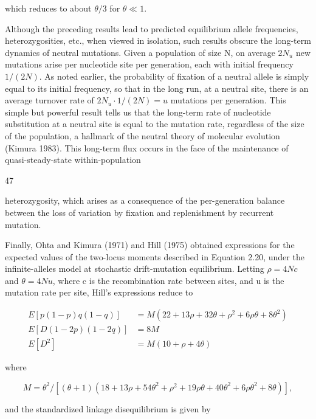 \documentclass{article}
\begin{document}
which reduces to about  $ \theta/3 $ for  $ \theta \ll 1 $.

Although the preceding results lead to predicted equilibrium allele frequencies, heterozygosities, etc., when viewed in isolation, such results obscure the long-term dynamics of neutral mutations. Given a population of size N, on average  $ 2N_u $ new mutations arise per nucleotide site per generation, each with initial frequency  $ 1/(2N) $. As noted earlier, the probability of fixation of a neutral allele is simply equal to its initial frequency, so that in the long run, at a neutral site, there is an average turnover rate of  $ 2N_u \cdot 1/(2N) = u $ mutations per generation. This simple but powerful result tells us that the long-term rate of nucleotide substitution at a neutral site is equal to the mutation rate, regardless of the size of the population, a hallmark of the neutral theory of molecular evolution (Kimura 1983). This long-term flux occurs in the face of the maintenance of quasi-steady-state within-population

47

heterozygosity, which arises as a consequence of the per-generation balance between the loss of variation by fixation and replenishment by recurrent mutation.

Finally, Ohta and Kimura (1971) and Hill (1975) obtained expressions for the expected values of the two-locus moments described in Equation 2.20, under the infinite-alleles model at stochastic drift-mutation equilibrium. Letting  $ \rho = 4Nc $ and  $ \theta = 4Nu $, where c is the recombination rate between sites, and u is the mutation rate per site, Hill's expressions reduce to

\begin{equation}
\begin{aligned}E[p(1-p)q(1-q)]&=M(22+13\rho+32\theta+\rho^{2}+6\rho\theta+8\theta^{2})\\E[D(1-2p)(1-2q)]&=8M\\E[D^{2}]&=M(10+\rho+4\theta)\end{aligned}
\tag{2.28a}
\label{eq:2_28a}
\end{equation}

where

\begin{equation}
M=\theta^{2}/[(\theta+1)(18+13\rho+54\theta^{2}+\rho^{2}+19\rho\theta+40\theta^{2}+6\rho\theta^{2}+8\theta)],
\tag{2.28b}
\label{eq:2_28b}
\end{equation}

and the standardized linkage disequilibrium is given by
\end{document}
